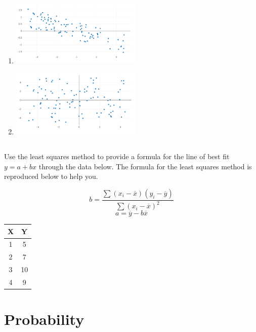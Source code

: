\documentclass[twocolumn]{article}
\begin{document}
    \begin{enumerate}
        \item\includegraphics[width=0.49\textwidth]{correlation}
        \item \includegraphics[width=0.49\textwidth]{nocorrelation}
    \end{enumerate}

\subsection{}

    Use the least squares method to provide a formula for the line of best fit $y = a + bx$ through the data below. The formula for the least squares method is reproduced below to help you.

    \begin{multicols}{2}
    $$ b = \frac{\sum{(x_i - \overline{x})(y_i - \overline{y})}}{\sum{(x_i - \overline{x})^2}} $$
    $$ a = \overline{y} - b\overline{x}$$
    \begin{center}
        \begin{tabular}{c | c}
            \toprule
            X & Y  \\
            \midrule
            1 & 5 \\
            2 & 7 \\
            3 & 10 \\
            4 & 9 \\
            \bottomrule
        \end{tabular}        
    \end{center}
\end{multicols}

\clearpage
\section{Probability}
\end{document}
